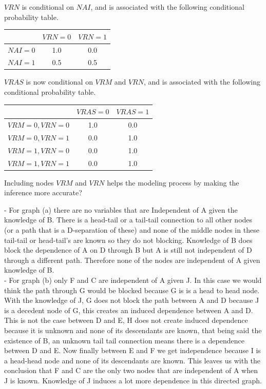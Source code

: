 \documentclass[solution, letterpaper]{cs121}
\begin{document}
\begin{empfile}
$VRN$ is conditional on $NAI$, and is associated with the following conditional probability table.
\begin{center}
\begin{tabular}{ c |c c }
   & $VRN = 0$ & $VRN = 1$ \\
   \hline
  $NAI = 0$ & 1.0 & 0.0 \\
  $NAI = 1$ & 0.5 & 0.5 \\
\end{tabular}
\end{center}

$VRAS$ is now conditional on $VRM$ and $VRN$, and is associated with the following conditional probability table.
\begin{center}
\begin{tabular}{ c |c c }
   & $VRAS = 0$ & $VRAS = 1$ \\
   \hline
  $VRM = 0, VRN = 0 $ & 1.0 & 0.0 \\
  $VRM = 0, VRN = 1 $ & 0.0 & 1.0 \\
  $VRM = 1, VRN = 0 $ & 0.0 & 1.0 \\
  $VRM = 1, VRN = 1 $ & 0.0 & 1.0 \\
\end{tabular}
\end{center}

\subproblem %
Including nodes $VRM$ and $VRN$ helps the modeling process by making the inference more accurate? 

\subproblem 
- For graph (a) there are no variables that are Independent of A given the knowledge of B. There is a head-tail or a tail-tail connection to all other nodes (or a path that is a D-separation of these) and none of the middle nodes in these tail-tail or head-tail's are known so they do not blocking. Knowledge of B does block the dependence of A on D through B but A is still not independent of D through a different path. Therefore none of the nodes are independent of A given knowledge of B.\\

- For graph (b) only F and C are independent of A given J. In this case we would think the path through G would be blocked because G is is a head to head node. With the knowledge of J, G does not block the path between A and D because J is a decedent node of G, this creates an induced dependence between A and D. This is not the case between D and E, H does not create induced dependence because it is unknown and none of its descendants are known, that being said the existence of B, an unknown tail tail connection means there is a dependence between D and E. Now finally between E and F we get independence because I is a head-head node and none of its descendants are known. This leaves us with the conclusion that F and C are the only two nodes that are independent of A when J is known. Knowledge of J induces a lot more dependence in this directed graph.


\end{empfile}
\end{document}
